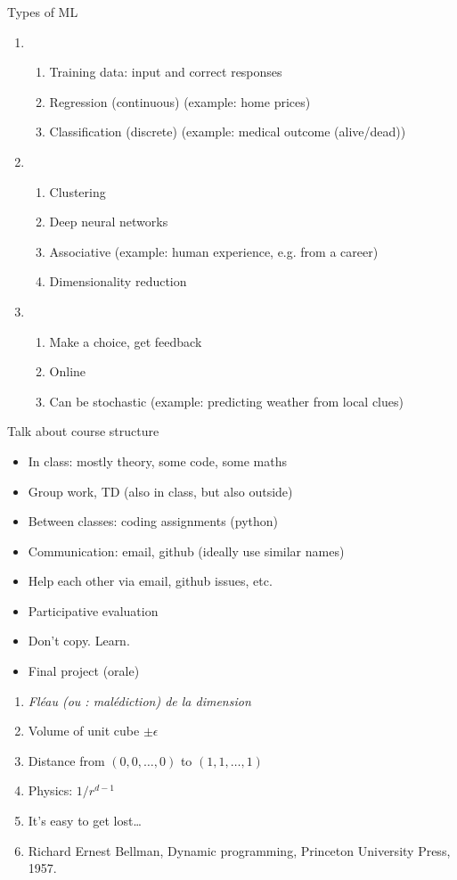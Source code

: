 Types of ML
\begin{enumerate}
\item {}
  \begin{enumerate}
  \item Training data: input and correct responses
  \item Regression (continuous) (example: home prices)
  \item Classification (discrete) (example: medical outcome (alive/dead))
  \end{enumerate}
\item {}
  \begin{enumerate}
  \item Clustering
  \item Deep neural networks
  \item Associative (example: human experience, e.g. from a career)
  \item Dimensionality reduction
  \end{enumerate}
\item {}
  \begin{enumerate}
  \item Make a choice, get feedback
  \item Online
  \item Can be stochastic (example: predicting weather from local clues)
  \end{enumerate}
\end{enumerate}

Talk about course structure
\begin{itemize}
\item In class: mostly theory, some code, some maths
\item Group work, TD (also in class, but also outside)
\item Between classes: coding assignments (python)
\item Communication: email, github (ideally use similar names)
\item Help each other via email, github issues, etc.
\item Participative evaluation
\item Don't copy.  Learn.
\item Final project (orale)
\end{itemize}

\begin{enumerate}
\item \textit{Fléau (ou : malédiction) de la dimension}
\item Volume of unit cube $\pm\epsilon$
\item Distance from $(0,0,\ldots,0)$ to $(1,1,\ldots,1)$
\item Physics: $1/r^{d-1}$
\item It's easy to get lost\dots
\item Richard Ernest Bellman, Dynamic programming, Princeton
  University Press, 1957.
\end{enumerate}

